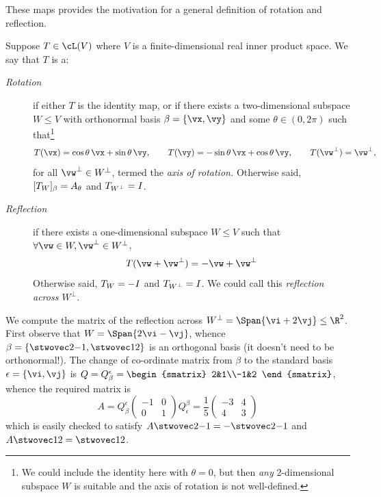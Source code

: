 These maps provides the motivation for a general definition of rotation and reflection.
	
\begin{defn}{}{}
Suppose $T\in\cL(V)$ where $V$ is a finite-dimensional real inner product space. We say that $T$ is a:
\begin{description}
  \item[\normalfont\emph{Rotation}] if either $T$ is the identity map, or if there exists a two-dimensional subspace $W\le V$ with orthonormal basis $\beta=\{\vx,\vy\}$ and some $\theta\in(0,2\pi)$ such that\footnote{We could include the identity here with $\theta=0$, but then \emph{any} 2-dimensional subspace $W$ is suitable and the axis of rotation is not well-defined.}
  \[T(\vx)=\cos\theta\,\vx+\sin\theta\,\vy,\qquad T(\vy)=-\sin\theta\,\vx+\cos\theta\,\vy,\qquad T(\vw^\perp)=\vw^\perp,\]
  for all $\vw^\perp\in W^\perp$, termed the \emph{axis of rotation.} Otherwise said, $[T_{W}]_\beta=A_\theta$ and $T_{W^\perp}=I$. 
  
  \item[\normalfont\emph{Reflection}] if there exists a one-dimensional subspace $W\le V$ such that $\forall \vw\in W,\vw^\perp\in W^\perp$,
  \[T(\vw+\vw^\perp)=-\vw+\vw^\perp\]
  Otherwise said, $T_{W}=-I$ and $T_{W^\perp}=I$. We could call this \emph{reflection across $W^\perp$.}
\end{description}
\end{defn}

\begin{example}{}{}
We compute the matrix of the reflection across $W^\perp=\Span\{\vi+2\vj\}\le\R^2$.\\[5pt]
First observe that $W=\Span\{2\vi-\vj\}$, whence $\beta=\{\stwovec 2{-1},\stwovec 12\}$ is an orthogonal basis (it doesn't need to be orthonormal!). The change of co-ordinate matrix from $\beta$ to the standard basis $\epsilon=\{\vi,\vj\}$ is $Q=Q_\beta^\epsilon=\begin{smatrix}
2&1\\-1&2
\end{smatrix}$, whence the required matrix is
\[A=Q_\beta^\epsilon\begin{pmatrix}
-1&0\\0&1
\end{pmatrix}Q_\epsilon^\beta =\frac 15\begin{pmatrix}
-3&4\\4&3
\end{pmatrix}\]
which is easily checked to satisfy $A\stwovec 2{-1}=-\stwovec 2{-1}$ and $A\stwovec 12=\stwovec 12$.
\end{example}

